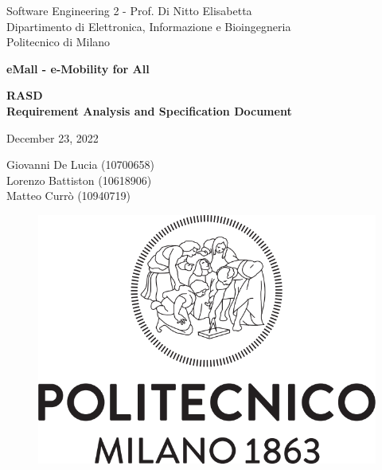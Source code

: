 \documentclass{article}
\begin{document}
\begin{titlepage}
  \centering
  {\normalsize
    Software Engineering 2 - Prof. Di Nitto Elisabetta \\
    Dipartimento di Elettronica, Informazione e Bioingegneria \\
    Politecnico di Milano \par
  }     \vspace{3cm}
  {\Huge \textbf{eMall - e-Mobility for All\\} } \vspace{1cm}
  {\large \textbf{RASD\\Requirement Analysis and Specification Document} \par} \vspace{1cm}
  {\normalsize December 23, 2022 \par} \vspace{4cm}
  {\normalsize Giovanni De Lucia (10700658) \\ Lorenzo Battiston (10618906) \\  Matteo Currò (10940719)\par} \vspace{4cm}
  \begin{figure}[h]
    \centering
    \includegraphics[scale=0.3]{src/Logo_Politecnico_Milano.png}
  \end{figure} \vspace{0.5cm}
\end{titlepage}

\tableofcontents







\end{document}
